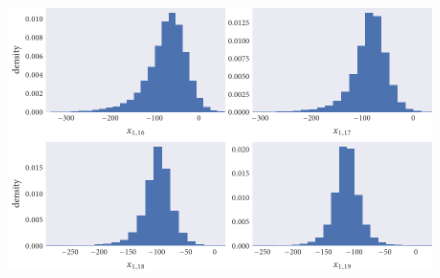 \begin{figure}[tb]
  \includegraphics{x_hist.pdf}
  \caption{}
  \label{fig:x_hist}
\end{figure}










